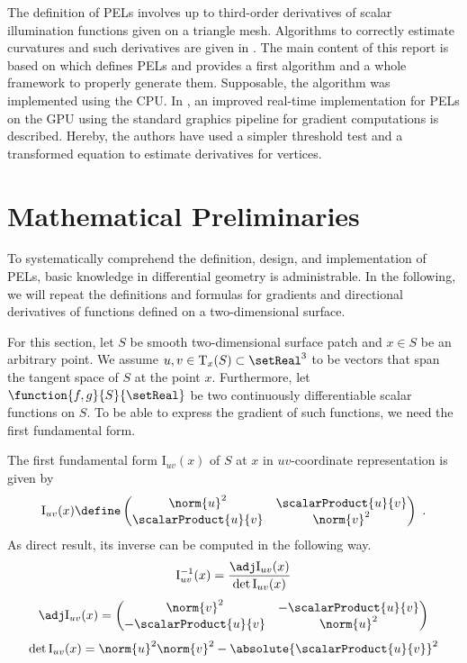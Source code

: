 \documentclass[9pt,fleqn,twoside,twocolumn]{stdglobal}
\begin{document}
  The definition of PELs involves up to third-order derivatives of scalar illumination functions given on a triangle mesh.
  Algorithms to correctly estimate curvatures and such derivatives are given in \textcite{rusinkiewicz2004}.
  The main content of this report is based on \textcite{xie2007} which defines PELs and provides a first algorithm and a whole framework to properly generate them.
  Supposable, the algorithm was implemented using the CPU.
  In \textcite{zhang2010}, an improved real-time implementation for PELs on the GPU using the standard graphics pipeline for gradient computations is described.
  Hereby, the authors have used a simpler threshold test and a transformed equation to estimate derivatives for vertices.


\section{Mathematical Preliminaries}
  To systematically comprehend the definition, design, and implementation of PELs, basic knowledge in differential geometry is administrable.
  In the following, we will repeat the definitions and formulas for gradients and directional derivatives of functions defined on a two-dimensional surface.

  For this section, let $S$ be smooth two-dimensional surface patch and $x\in S$ be an arbitrary point.
  We assume $u,v\in\mathrm{T}_x(S)\subset\setReal^3$ to be vectors that span the tangent space of $S$ at the point $x$.
  Furthermore, let $\function{f,g}{S}{\setReal}$ be two continuously differentiable scalar functions on $S$.
  To be able to express the gradient of such functions, we need the first fundamental form.

  \begin{definition*}
    The first fundamental form $\mathrm{I}_{uv}(x)$ of $S$ at $x$ in $uv$-coordinate representation is given by
    \[
      \mathrm{I}_{uv}(x) \define
      \begin{pmatrix}
        \norm{u}^2 & \scalarProduct{u}{v} \\
        \scalarProduct{u}{v} & \norm{v}^2
      \end{pmatrix} \ .
    \]
    As direct result, its inverse can be computed in the following way.
    \[
      \mathrm{I}^{-1}_{uv}(x) = \frac{\adj \mathrm{I}_{uv}(x)}{\det \mathrm{I}_{uv}(x)}
    \]
    \[
      \adj\mathrm{I}_{uv}(x) =
      \begin{pmatrix}
        \norm{v}^2 & -\scalarProduct{u}{v} \\
        -\scalarProduct{u}{v} & \norm{u}^2
      \end{pmatrix}
    \]
    \[
      \det\mathrm{I}_{uv}(x) = \norm{u}^2\norm{v}^2 - \absolute{\scalarProduct{u}{v}}^2
    \]
  \end{definition*}
\end{document}
